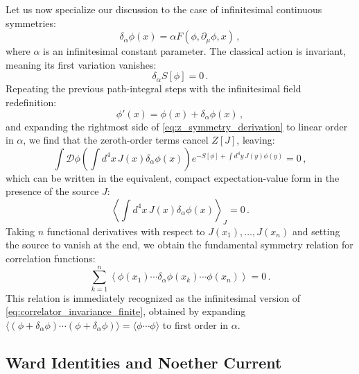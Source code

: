 Let us now specialize our discussion to the case of infinitesimal continuous symmetries:
\begin{equation} \label{eq:infinitesimal_symmetry_def}
    \delta_\alpha \phi(x) = \alpha F(\phi, \partial_\mu\phi, x) \, ,
\end{equation}
where \(\alpha\) is an infinitesimal constant parameter. The classical action is invariant, meaning its first variation vanishes:
\begin{equation} \label{eq:infinitesimal_action_invariance}
    \delta_\alpha S[\phi] = 0 \, .
\end{equation}
Repeating the previous path-integral steps with the infinitesimal field redefinition:
\begin{equation} \label{eq:infinitesimal_field_redef}
    \phi'(x) = \phi(x) + \delta_\alpha \phi(x) \, ,
\end{equation}
and expanding the rightmost side of \eqref{eq:z_symmetry_derivation} to linear order in \(\alpha\), we find that the zeroth-order terms cancel \(Z[J]\), leaving:
\begin{equation} \label{eq:linear_order_alpha_integral}
    \int \mathcal{D}\phi \left( \int d^4x \, J(x) \delta_\alpha \phi(x) \right) e^{-S[\phi] + \int d^4y \, J(y)\phi(y)} = 0 \, ,
\end{equation}
which can be written in the equivalent, compact expectation-value form in the presence of the source \(J\):
\begin{equation} \label{eq:source_ward_identity}
    \left\langle \int d^4x \, J(x) \delta_\alpha \phi(x) \right\rangle_J = 0 \, .
\end{equation}
Taking \(n\) functional derivatives with respect to \(J(x_1), \dots, J(x_n)\) and setting the source to vanish at the end, we obtain the fundamental symmetry relation for correlation functions:
\begin{equation} \label{eq:infinitesimal_correlator_invariance}
    \boxed{\sum_{k=1}^n \left\langle \phi(x_1) \cdots \delta_\alpha \phi(x_k) \cdots \phi(x_n) \right\rangle = 0} \, .
\end{equation}
This relation is immediately recognized as the infinitesimal version of \eqref{eq:correlator_invariance_finite}, obtained by expanding \(\langle (\phi + \delta_\alpha \phi) \cdots (\phi + \delta_\alpha \phi) \rangle = \langle \phi \cdots \phi \rangle\) to first order in \(\alpha\).

\subsection{Ward Identities and Noether Current}

